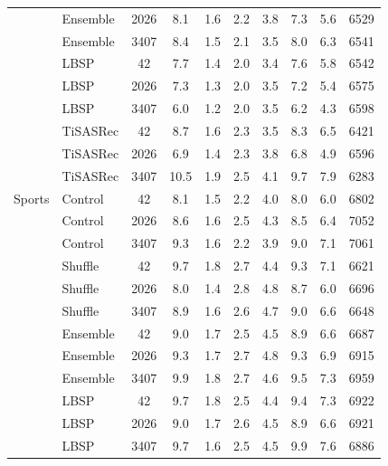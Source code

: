 \begin{longtable}{@{}llS[table-format=4.0,group-digits=false]S[table-format=2.1]S[table-format=2.1]S[table-format=2.1]S[table-format=2.1]S[table-format=2.1]S[table-format=2.1]S[table-format=5.0]@{}}
 & Ensemble & 2026 & 8.1 & 1.6 & 2.2 & 3.8 & 7.3 & 5.6 & 6529\\ %
 & Ensemble & 3407 & 8.4 & 1.5 & 2.1 & 3.5 & 8.0 & 6.3 & 6541\\ %
 & LBSP & 42 & 7.7 & 1.4 & 2.0 & 3.4 & 7.6 & 5.8 & 6542\\ %
 & LBSP & 2026 & 7.3 & 1.3 & 2.0 & 3.5 & 7.2 & 5.4 & 6575\\ %
 & LBSP & 3407 & 6.0 & 1.2 & 2.0 & 3.5 & 6.2 & 4.3 & 6598\\ %
 & TiSASRec & 42 & 8.7 & 1.6 & 2.3 & 3.5 & 8.3 & 6.5 & 6421\\ %
 & TiSASRec & 2026 & 6.9 & 1.4 & 2.3 & 3.8 & 6.8 & 4.9 & 6596\\ %
 & TiSASRec & 3407 & 10.5 & 1.9 & 2.5 & 4.1 & 9.7 & 7.9 & 6283\\ %
\midrule
Sports & Control & 42 & 8.1 & 1.5 & 2.2 & 4.0 & 8.0 & 6.0 & 6802\\ %
 & Control & 2026 & 8.6 & 1.6 & 2.5 & 4.3 & 8.5 & 6.4 & 7052\\ %
 & Control & 3407 & 9.3 & 1.6 & 2.2 & 3.9 & 9.0 & 7.1 & 7061\\ %
 & Shuffle & 42 & 9.7 & 1.8 & 2.7 & 4.4 & 9.3 & 7.1 & 6621\\ %
 & Shuffle & 2026 & 8.0 & 1.4 & 2.8 & 4.8 & 8.7 & 6.0 & 6696\\ %
 & Shuffle & 3407 & 8.9 & 1.6 & 2.6 & 4.7 & 9.0 & 6.6 & 6648\\ %
 & Ensemble & 42 & 9.0 & 1.7 & 2.5 & 4.5 & 8.9 & 6.6 & 6687\\ %
 & Ensemble & 2026 & 9.3 & 1.7 & 2.7 & 4.8 & 9.3 & 6.9 & 6915\\ %
 & Ensemble & 3407 & 9.9 & 1.8 & 2.7 & 4.6 & 9.5 & 7.3 & 6959\\ %
 & LBSP & 42 & 9.7 & 1.8 & 2.5 & 4.4 & 9.4 & 7.3 & 6922\\ %
 & LBSP & 2026 & 9.0 & 1.7 & 2.6 & 4.5 & 8.9 & 6.6 & 6921\\ %
 & LBSP & 3407 & 9.7 & 1.6 & 2.5 & 4.5 & 9.9 & 7.6 & 6886\\ %

\end{longtable}

